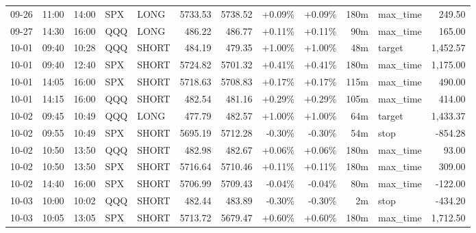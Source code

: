 \documentclass[11pt,a4paper,twoside]{article}
\begin{document}
\begin{center}
\begin{longtable}{>{\color{txtmain}}l l l l l r r r r r >{\color{txtmain}}l r}
09-26 & 11:00 & 14:00 & SPX & LONG & 5733.53 & 5738.52 & \textcolor{wingreen}{+0.09\%} & \textcolor{wingreen}{+0.09\%} & 180m & max\_time & \textcolor{wingreen}{249.50} \\
09-27 & 14:30 & 16:00 & QQQ & LONG & 486.22 & 486.77 & \textcolor{wingreen}{+0.11\%} & \textcolor{wingreen}{+0.11\%} & 90m & max\_time & \textcolor{wingreen}{165.00} \\
10-01 & 09:40 & 10:28 & QQQ & SHORT & 484.19 & 479.35 & \textcolor{wingreen}{+1.00\%} & \textcolor{wingreen}{+1.00\%} & 48m & target & \textcolor{wingreen}{1,452.57} \\
10-01 & 09:40 & 12:40 & SPX & SHORT & 5724.82 & 5701.32 & \textcolor{wingreen}{+0.41\%} & \textcolor{wingreen}{+0.41\%} & 180m & max\_time & \textcolor{wingreen}{1,175.00} \\
10-01 & 14:05 & 16:00 & SPX & SHORT & 5718.63 & 5708.83 & \textcolor{wingreen}{+0.17\%} & \textcolor{wingreen}{+0.17\%} & 115m & max\_time & \textcolor{wingreen}{490.00} \\
10-01 & 14:15 & 16:00 & QQQ & SHORT & 482.54 & 481.16 & \textcolor{wingreen}{+0.29\%} & \textcolor{wingreen}{+0.29\%} & 105m & max\_time & \textcolor{wingreen}{414.00} \\
10-02 & 09:45 & 10:49 & QQQ & LONG & 477.79 & 482.57 & \textcolor{wingreen}{+1.00\%} & \textcolor{wingreen}{+1.00\%} & 64m & target & \textcolor{wingreen}{1,433.37} \\
10-02 & 09:55 & 10:49 & SPX & SHORT & 5695.19 & 5712.28 & \textcolor{lossred}{-0.30\%} & \textcolor{lossred}{-0.30\%} & 54m & stop & \textcolor{lossred}{-854.28} \\
10-02 & 10:50 & 13:50 & QQQ & SHORT & 482.98 & 482.67 & \textcolor{wingreen}{+0.06\%} & \textcolor{wingreen}{+0.06\%} & 180m & max\_time & \textcolor{wingreen}{93.00} \\
10-02 & 10:50 & 13:50 & SPX & SHORT & 5716.64 & 5710.46 & \textcolor{wingreen}{+0.11\%} & \textcolor{wingreen}{+0.11\%} & 180m & max\_time & \textcolor{wingreen}{309.00} \\
10-02 & 14:40 & 16:00 & SPX & SHORT & 5706.99 & 5709.43 & \textcolor{lossred}{-0.04\%} & \textcolor{lossred}{-0.04\%} & 80m & max\_time & \textcolor{lossred}{-122.00} \\
10-03 & 10:00 & 10:02 & QQQ & SHORT & 482.44 & 483.89 & \textcolor{lossred}{-0.30\%} & \textcolor{lossred}{-0.30\%} & 2m & stop & \textcolor{lossred}{-434.20} \\
10-03 & 10:05 & 13:05 & SPX & SHORT & 5713.72 & 5679.47 & \textcolor{wingreen}{+0.60\%} & \textcolor{wingreen}{+0.60\%} & 180m & max\_time & \textcolor{wingreen}{1,712.50} \\

\end{longtable}
\end{center}
\end{document}
